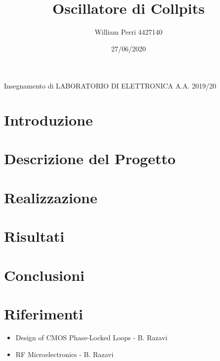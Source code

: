 \documentclass{article}
\title{Oscillatore di Collpits}
\author{William Perri 4427140 }
\date{27/06/2020}
\begin{document}
\maketitle
Insegnamento di LABORATORIO DI ELETTRONICA A.A. 2019/20

\newpage
\tableofcontents
\newpage
\section{Introduzione}

\newpage
\section{Descrizione del Progetto}

\newpage
\section{Realizzazione}

\newpage
\section{Risultati}

\newpage

\section{Conclusioni}

\newpage
\section{Riferimenti}
\begin{itemize}
\item Design of CMOS Phase-Locked Loops - B. Razavi
\item RF Microelectronics - B. Razavi
\end{itemize}
\end{document}
